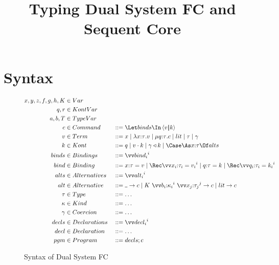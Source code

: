 \documentclass{article}
\begin{document}
\title{Typing Dual System FC and Sequent Core}

\maketitle

\section{Syntax}
\label{sec:syntax}

\begin{figure}[h]
\centering
\begin{gather*}
\begin{aligned}
  x, y, z, f, g, h, K &\in Var
  \\
  q, r &\in KontVar
  \\
  a, b, T &\in TypeVar
  \\
  \com &\in Command
  &
  &::= \mcut{\tm}{\ko}{\binds}
  \\
  \tm &\in Term
  &
  &::= x
  \Alt \fn{\ann x \ty} \tm
  \Alt \compute{\ann q \ty} \com
  \Alt \lit
  \Alt \ty
  \Alt \cn
  \\
  \ko &\in Kont
  &
  &::= q
  \Alt \app{\tm}{\ko}
  \Alt \koerce{\cn}{\ko}
  \Alt \caseas{\ann x \ty}{\alts}
  \\
  \binds &\in Bindings
  &
  &::= \vect[i]{\abind_i}
  \\
  \abind &\in Binding
  &
  &::= \bind{\ann x \ty}{\tm}
  \Alt \Rec \vect[i]{\bind{\ann{x_i}{\ty_i}}{\tm_i}}
  \Alt \bind{\ann q \ty}{\ko}
  \Alt \Rec \vect[i]{\bind{\ann{q_i}{\ty_i}}{\ko_i}}
  \\
  \alts &\in Alternatives
  &
  &::= \vect[i]{\analt_i}
  \\
  \analt &\in Alternative
  &
  &::= \alt{\blank}{\com}
  \Alt \alt{K ~ \vect[i]{\ann{b_i}{\ki_i}} ~ \vect[j]{\ann{x_j}{\ty_j}}}{\com}
  \Alt \alt{\lit}{\com}
  \\
  \ty &\in Type
  &
  &::= \dots
  \\
  \ki &\in Kind
  &
  &::= \dots
  \\
  \cn &\in Coercion
  &
  &::= \dots
  \\
  \decls &\in Declarations
  &
  &::= \vect[i]{\decl_i}
  \\
  \decl &\in Declaration
  &
  &::= \dots
  \\
  \pgm &\in Program
  &
  &::= \decls; \com
\end{aligned}
\end{gather*}
\caption{Syntax of Dual System FC}
\label{fig:dual-fc-syntax}
\end{figure}
\end{document}
